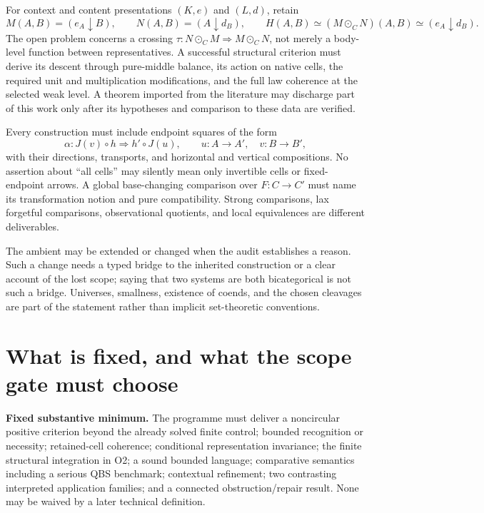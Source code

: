 \documentclass[11pt,a4paper]{article}
\begin{document}
For context and content presentations \((K,e)\) and \((L,d)\), retain
\[
 M(A,B)=(e_A\downarrow B),\qquad
 N(A,B)=(A\downarrow d_B),\qquad
 H(A,B)\simeq(M\odot_C N)(A,B)\simeq(e_A\downarrow d_B).
\]
The open problem concerns a crossing
\(\tau:N\odot_C M\Rightarrow M\odot_C N\), not merely a body-level
function between representatives. A successful structural criterion must
derive its descent through pure-middle balance, its action on native cells,
the required unit and multiplication modifications, and the full law
coherence at the selected weak level. A theorem imported from the literature
may discharge part of this work only after its hypotheses and comparison to
these data are verified.

Every construction must include endpoint squares of the form
\[
 \alpha:J(v)\circ h\Longrightarrow h'\circ J(u),
 \qquad u:A\to A',\quad v:B\to B',
\]
with their directions, transports, and horizontal and vertical compositions.
No assertion about ``all cells'' may silently mean only invertible cells or
fixed-endpoint arrows. A global base-changing comparison over \(F:C\to C'\)
must name its transformation notion and pure compatibility. Strong
comparisons, lax forgetful comparisons, observational quotients, and local
equivalences are different deliverables.

The ambient may be extended or changed when the audit establishes a reason.
Such a change needs a typed bridge to the inherited construction or a clear
account of the lost scope; saying that two systems are both bicategorical is
not such a bridge. Universes, smallness, existence of coends, and the chosen
cleavages are part of the statement rather than implicit set-theoretic
conventions.

\section{What is fixed, and what the scope gate must choose}\label{sec:scope}

\textbf{Fixed substantive minimum.} The programme must deliver a noncircular
positive criterion beyond the already solved finite control; bounded
recognition or necessity; retained-cell coherence; conditional representation
invariance; the finite structural integration in O2; a sound bounded language;
comparative semantics including a serious QBS benchmark; contextual refinement;
two contrasting interpreted application families; and a connected
obstruction/repair result. None may be waived by a later technical definition.
\end{document}
